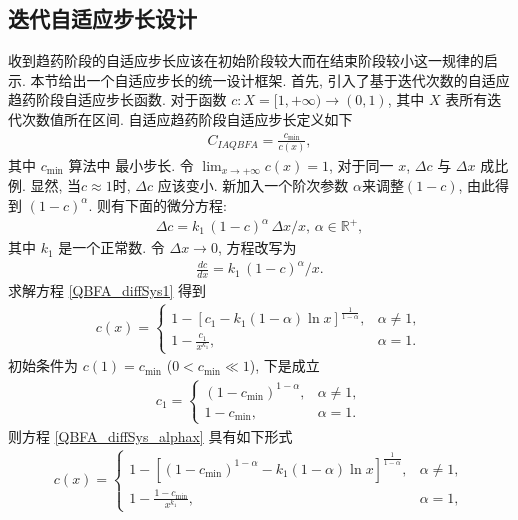 \subsection{迭代自适应步长设计}
收到趋药阶段的自适应步长应该在初始阶段较大而在结束阶段较小这一规律的启示. 本节给出一个自适应步长的统一设计框架.
首先, 引入了基于迭代次数的自适应趋药阶段自适应步长函数. 对于函数 $c: X=[1, +\infty) \rightarrow (0,1)$, 其中 $X$ 表所有迭代次数值所在区间.
自适应趋药阶段自适应步长定义如下
\begin{align}\label{CIAQBFA1}
    C_{IAQBFA}=\frac {c_{\min}}{c(x)},
\end{align}
其中 $c_{\min}$ 算法中 最小步长. 令 $\lim_{x\rightarrow +\infty}c(x)=1$,
对于同一 $x$, $\Delta c$ 与 $\Delta x$ 成比例. 显然, 当$c\approx 1$时, $\Delta c$ 应该变小.
新加入一个阶次参数 $\alpha$来调整$(1-c)$, 由此得到 $(1-c)^\alpha$. 则有下面的微分方程:
\begin{eqnarray}
    \Delta c = k_1\, (1-c)^\alpha\,\Delta x/ x,\,\alpha \in \mathbb R^+,
\end{eqnarray}
其中 $k_1$ 是一个正常数. 令 $\Delta x \rightarrow 0$, 方程改写为
\begin{eqnarray}\label{QBFA_diffSys1}
    \frac{d c}{d x} = k_1\, (1-c)^\alpha/x.
\end{eqnarray}
求解方程 \eqref{QBFA_diffSys1} 得到
\begin{align}\label{QBFA_diffSys_alphax}
  c(x)= \left\{
  \begin{array}{ll}
    1- \left[c_1-k_1(1-\alpha)\ln x \right]^{\frac 1 {1-\alpha}},&  \alpha\neq 1,\\
    1-\frac {c_1} {x^{k_{1}}},&  \alpha= 1.
  \end{array}
  \right.
\end{align}
初始条件为 $c(1)=c_{\min}$ ($0<c_{\min}\ll 1$), 下是成立
\begin{align}
  c_1=\left\{
  \begin{array}{ll}
  (1-c_{\min})^ {1-\alpha},&  \alpha\neq 1,\\
  1-c_{\min},&  \alpha= 1.
  \end{array}
  \right.
\end{align}
则方程 \eqref{QBFA_diffSys_alphax} 具有如下形式
\begin{align}
c(x)=
\left\{
  \begin{array}{ll}
  1- \left[(1-c_{\min})^{{1-\alpha}}-k_1(1-\alpha)\ln x \right]^{\frac 1 {1-\alpha}},&  \alpha\neq 1,\\
  1-\frac{1-c_{\min}} {x^{k_1}},&  \alpha= 1,
  \end{array}
  \right.
\end{align}

